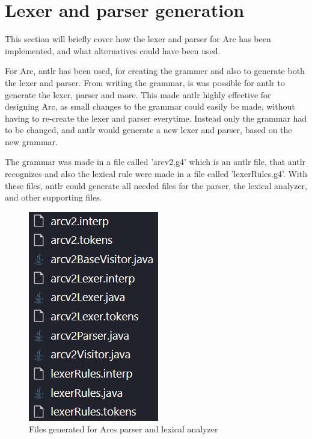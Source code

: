 \section{Lexer and parser generation}

This section will briefly cover how the lexer and parser for Arc has been implemented, and what alternatives could have been used.

For Arc, \gls{antlr} has been used, for creating the grammer and also to generate both the lexer and parser. From writing the grammar, is was possible for \gls{antlr} to generate the lexer, parser and more.\cite{Parr2014} This made \gls{antlr} highly effective for designing Arc, as small changes to the grammar could easily be made, without having to re-create the lexer and parser everytime. Instead only the grammar had to be changed, and \gls{antlr} would generate a new lexer and parser, based on the new grammar.

The grammar was made in a file called 'arcv2.g4' which is an \gls{antlr} file, that \gls{antlr} recognizes and also the lexical rule were made in a file called 'lexerRules.g4'. With these files, \gls{antlr} could generate all needed files for the parser, the lexical analyzer, and other supporting files.

\begin{figure}[htb!]
    \begin{center}
        \includegraphics{figures/lexerAndParserFiles.png}
        \caption{Files generated for Arcs parser and lexical analyzer}
        \label{fig:lexerandparserfiles}
    \end{center}
\end{figure}

